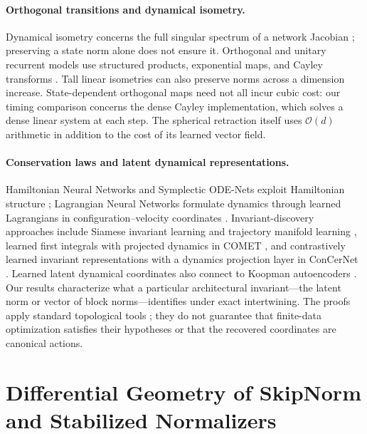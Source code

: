\documentclass[10pt]{article}
\theoremstyle{definition}
\theoremstyle{remark}
\begin{document}
\paragraph{Orthogonal transitions and dynamical isometry.}
Dynamical isometry concerns the full singular spectrum of a network Jacobian \citep{saxe2014exact, pennington2017resurrecting}; preserving a state norm alone does not ensure it. Orthogonal and unitary recurrent models use structured products, exponential maps, and Cayley transforms \citep{arjovsky2016unitary, lezcano2019cheap, helfrich2018orthogonal}. Tall linear isometries can also preserve norms across a dimension increase. State-dependent orthogonal maps need not all incur cubic cost: our timing comparison concerns the dense Cayley implementation, which solves a dense linear system at each step. The spherical retraction itself uses $\mathcal{O}(d)$ arithmetic in addition to the cost of its learned vector field.

\paragraph{Conservation laws and latent dynamical representations.}
Hamiltonian Neural Networks and Symplectic ODE-Nets exploit Hamiltonian structure \citep{greydanus2019hamiltonian, zhong2020symplectic}; Lagrangian Neural Networks formulate dynamics through learned Lagrangians in configuration--velocity coordinates \citep{cranmer2020lagrangian}. Invariant-discovery approaches include Siamese invariant learning \citep{wetzel2020discovering} and trajectory manifold learning \citep{liu2021ai}, learned first integrals with projected dynamics in COMET \citep{otto2023learning}, and contrastively learned invariant representations with a dynamics projection layer in ConCerNet \citep{zhang2023concernet}. Learned latent dynamical coordinates also connect to Koopman autoencoders \citep{lusch2018deep}. Our results characterize what a particular architectural invariant---the latent norm or vector of block norms---identifies under exact intertwining. The proofs apply standard topological tools \citep{brouwer1911beweis, hatcher2002algebraic}; they do not guarantee that finite-data optimization satisfies their hypotheses or that the recovered coordinates are canonical actions.

\section{Differential Geometry of SkipNorm and Stabilized Normalizers}
\label{sec:geometry}
\end{document}
